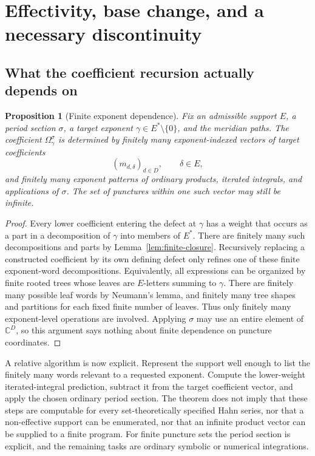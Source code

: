 \documentclass[11pt,letterpaper]{article}
\numberwithin{equation}{section}
\newtheorem{proposition}[theorem]{Proposition}
\theoremstyle{definition}
\theoremstyle{remark}
\newcommand{\C}{\mathbb C}
\begin{document}
\section{Effectivity, base change, and a necessary discontinuity}
\label{sec:effectivity}

\subsection{What the coefficient recursion actually depends on}
\begin{proposition}[Finite exponent dependence]\label{prop:dependence}
Fix an admissible support $E$, a period section $\sigma$, a target exponent
$\gamma\in E^*\setminus\{0\}$, and the meridian paths. The coefficient
$\Omega^\sigma_\gamma$ is determined by finitely many exponent-indexed
vectors of target coefficients
\[
 (m_{d,\delta})_{d\in D},\qquad \delta\in E,
\]
and finitely many exponent patterns of ordinary products, iterated
integrals, and applications of $\sigma$. The set of punctures within one
such vector may still be infinite.
\end{proposition}
\begin{proof}
Every lower coefficient entering the defect at $\gamma$ has a weight that
occurs as a part in a decomposition of $\gamma$ into members of $E^*$.
There are finitely many such decompositions and parts by
Lemma~\ref{lem:finite-closure}. Recursively replacing a constructed
coefficient by its own defining defect only refines one of these finite
exponent-word decompositions. Equivalently, all expressions can be
organized by finite rooted trees whose leaves are $E$-letters summing to
$\gamma$. There are finitely many possible leaf words by Neumann's lemma,
and finitely many tree shapes and partitions for each fixed finite number
of leaves. Thus only finitely many exponent-level operations are involved.
Applying $\sigma$ may use an entire element of $\C^D$, so this argument
says nothing about finite dependence on puncture coordinates.
\end{proof}

A relative algorithm is now explicit. Represent the support well enough to
list the finitely many words relevant to a requested exponent. Compute the
lower-weight iterated-integral prediction, subtract it from the target
coefficient vector, and apply the chosen ordinary period section.
The theorem does not imply that these steps are computable for every
set-theoretically specified Hahn series, nor that a non-effective support
can be enumerated, nor that an infinite product vector can be supplied to a
finite program. For finite puncture sets the period section is explicit,
and the remaining tasks are ordinary symbolic or numerical integrations.
\end{document}
